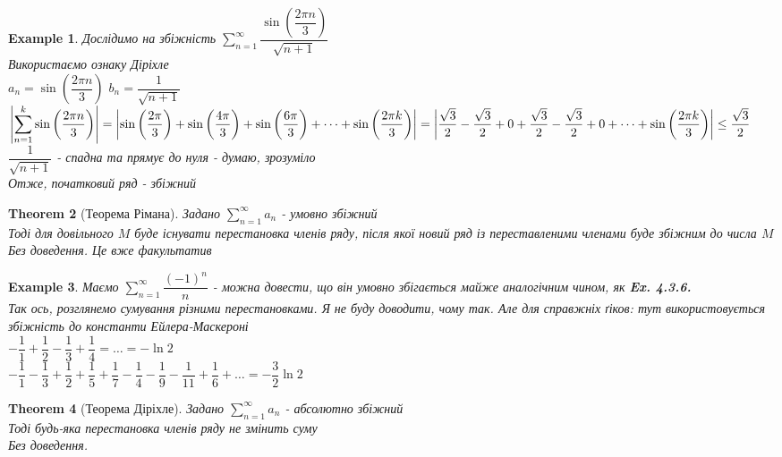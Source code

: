 \documentclass[a4paper, 14pt]{extarticle}
\def\huge{\displaystyle}
\theoremstyle{theoremdd}
\newtheorem{theorem}{Theorem}[subsection]
\theoremstyle{theoremdd}
\theoremstyle{theoremdd}
\theoremstyle{theoremdd}
\newtheorem{example}[theorem]{Example}
\theoremstyle{theoremdd}
\theoremstyle{theoremdd}
\theoremstyle{theoremdd}
\theoremstyle{theoremdd}
\begin{document}
\begin{example}
Дослідимо на збіжність $\huge\sum_{n=1}^\infty \dfrac{\sin \left( \dfrac{2 \pi n}{3} \right)}{\sqrt{n+1}}$\\
Використаємо ознаку Діріхле\\
$a_n = \sin \left( \dfrac{2 \pi n}{3} \right)$ \hspace{1cm} $b_n = \dfrac{1}{\sqrt{n+1}}$\\
$\abs{\huge\sum_{n=1}^k \sin \left( \dfrac{2 \pi n}{3} \right)} = \abs{\sin \left( \dfrac{2 \pi}{3} \right) + \sin \left( \dfrac{4 \pi}{3} \right) + \sin \left( \dfrac{6 \pi}{3} \right) + \dots + \sin \left( \dfrac{2 \pi k}{3} \right)} = \abs{\dfrac{\sqrt{3}}{2} - \dfrac{\sqrt{3}}{2} + 0 + \dfrac{\sqrt{3}}{2} - \dfrac{\sqrt{3}}{2} + 0 + \dots + \sin \left( \dfrac{2 \pi k}{3} \right)} \leq \dfrac{\sqrt{3}}{2}$\\
$\dfrac{1}{\sqrt{n+1}}$ - спадна та прямує до нуля - думаю, зрозуміло\\
Отже, початковий ряд - збіжний
\end{example}

\begin{theorem}[Теорема Рімана]
Задано $\huge \sum_{n=1}^\infty a_n$ - умовно збіжний\\
Тоді для довільного $M$ буде існувати перестановка членів ряду, після якої новий ряд із переставленими членами буде збіжним до числа $M$
\textit{Без доведення. Це вже факультатив}
\end{theorem}

\begin{example}
Маємо $\huge\sum_{n=1}^\infty \dfrac{(-1)^n}{n}$ - можна довести, що він умовно збігається майже аналогічним чином, як \textbf{Ex. 4.3.6.}\\
Так ось, розглянемо сумування різними перестановками. Я не буду доводити, чому так. Але для справжніх ґіков: тут використовується збіжність до константи Ейлера-Маскероні\\
$-\dfrac{1}{1} + \dfrac{1}{2} - \dfrac{1}{3} + \dfrac{1}{4} = \dots = -\ln 2$\\
$-\dfrac{1}{1} - \dfrac{1}{3} + \dfrac{1}{2} + \dfrac{1}{5} + \dfrac{1}{7} - \dfrac{1}{4} - \dfrac{1}{9} - \dfrac{1}{11} + \dfrac{1}{6} + \dots = -\dfrac{3}{2} \ln 2$
\end{example}

\begin{theorem}[Теорема Діріхле]
Задано $\huge \sum_{n=1}^\infty a_n$ - абсолютно збіжний\\
Тоді будь-яка перестановка членів ряду не змінить суму\\
\textit{Без доведення.}
\end{theorem}
\newpage
\end{document}
